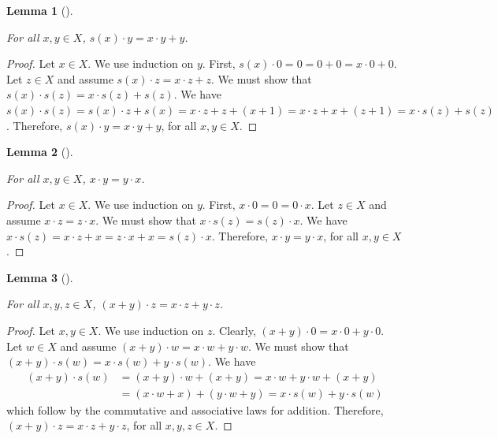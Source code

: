 \documentclass[
  letterpaper,
  10pt,
  reqno,
  twopage,
  openany]{book}
\theoremstyle{plain}
\newtheorem{lemma}{Lemma}[chapter]
\theoremstyle{definition}
\theoremstyle{definition}
\theoremstyle{definition}
\theoremstyle{plain}
\theoremstyle{plain}
\theoremstyle{remark}
\begin{document}
\leavevmode{}%
\begin{lemma}[]\label{lem-}

For all \(x,y\in X\), \(s(x)\cdot y=x\cdot y+y\).

\end{lemma}

\begin{proof}

Let \(x\in X\). We use induction on \(y\). First,
\(s(x)\cdot 0=0=0+0=x\cdot 0+0\). Let \(z\in X\) and assume
\(s(x)\cdot z=x\cdot z+z\). We must show that
\(s(x)\cdot s(z)=x\cdot s(z)+s(z)\). We have
\(s(x)\cdot s(z) =s(x)\cdot z +s(x) =x\cdot z+z +(x+1) =x\cdot z+x +(z+1)=x\cdot s(z)+s(z)\).
Therefore, \(s(x)\cdot y=x\cdot y+y\), for all \(x,y\in X\).

\end{proof}

\leavevmode{}%
\begin{lemma}[]\label{lem-}

For all \(x,y\in X\), \(x\cdot y = y\cdot x\).

\end{lemma}

\begin{proof}

Let \(x\in X\). We use induction on \(y\). First,
\(x\cdot 0 =0= 0\cdot x\). Let \(z\in X\) and assume
\(x\cdot z = z\cdot x\). We must show that
\(x\cdot s(z) = s(z)\cdot x\). We have
\(x\cdot s(z) = x\cdot z+x=z\cdot x+x=s(z)\cdot x\). Therefore,
\(x\cdot y = y\cdot x\), for all \(x,y\in X\).

\end{proof}

\leavevmode{}%
\begin{lemma}[]\label{lem-}

For all \(x,y,z\in X\), \((x+y)\cdot z=x\cdot z+y\cdot z\).

\end{lemma}

\begin{proof}

Let \(x,y\in X\). We use induction on \(z\). Clearly,
\((x+y)\cdot 0=x\cdot 0+y\cdot 0\). Let \(w\in X\) and assume
\((x+y)\cdot w=x\cdot w+y\cdot w\). We must show that
\((x+y)\cdot s(w)=x\cdot s(w)+y\cdot s(w)\). We have \begin{align*}
(x+y)\cdot s(w) & =(x+y) \cdot w+(x+y) = x\cdot w+y \cdot w+(x+y) \\
& = (x\cdot w+x)+(y \cdot w+y) =x\cdot s(w)+y\cdot s(w)
\end{align*} which follow by the commutative and associative laws for
addition. Therefore, \((x+y)\cdot z=x\cdot z+y\cdot z\), for all
\(x,y,z\in X\).

\end{proof}
\end{document}
